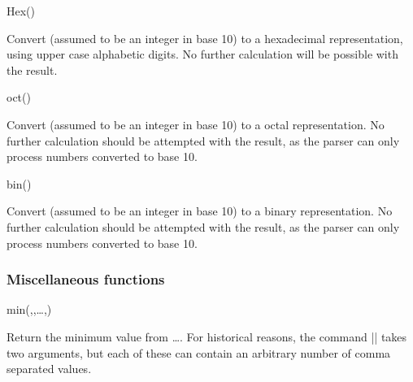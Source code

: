 \begin{math-function}{Hex()}
\mathcommand

  Convert  (assumed to be an integer in base 10) to a
  hexadecimal representation, using upper case alphabetic digits.
  No further calculation will be possible with the result.
  
\begin{codeexample}[]
 \pgfmathresult
\end{codeexample}
\end{math-function}

\begin{math-function}{oct()}
\mathcommand

  Convert  (assumed to be an integer in base 10) to a
  octal representation. 
  No further calculation should be attempted with the result, as
  the parser can only process numbers converted to base 10.
\begin{codeexample}[]
 \pgfmathresult
\end{codeexample}
\end{math-function}

\begin{math-function}{bin()}
\mathcommand

  Convert  (assumed to be an integer in base 10) to a
  binary representation.
  No further calculation should be attempted with the result, as
  the parser can only process numbers converted to base 10.
  
\begin{codeexample}[]
 \pgfmathresult
\end{codeexample}
\end{math-function}

\subsubsection{Miscellaneous functions}

\label{pgfmath-functions-misc}

\begin{math-function}{min(,,\ldots,)}

  Return the minimum value from \ldots{}. 
  For historical reasons, the command |\pgfmathmin| takes two
  arguments, but each of these can contain an arbitrary number
  of comma separated values.

\begin{codeexample}[]
 \pgfmathresult
\end{codeexample}

\end{math-function}


